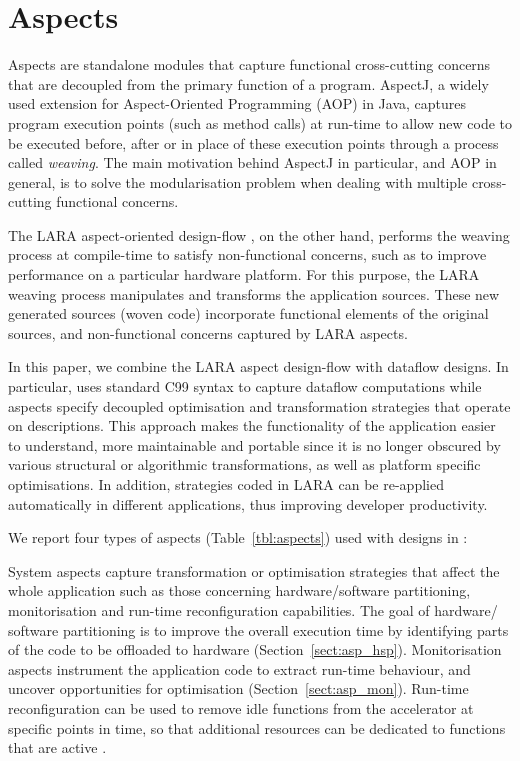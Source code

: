 \section{Aspects}
\label{sec:aspects}

Aspects are standalone modules that capture functional cross-cutting
concerns that are decoupled from the primary function of a
program. AspectJ\cite{Kiczales:2005:AP:1062455.1062640}, a widely
used extension for Aspect-Oriented Programming (AOP) in Java, captures
program execution points (such as method calls) at run-time to allow
new code to be executed before, after or in place of these execution
points through a process called \emph{weaving}. The main motivation
behind AspectJ in particular, and AOP in general, is to solve the
modularisation problem when dealing with multiple cross-cutting
functional concerns.

The LARA aspect-oriented
design-flow \cite{Cardoso:Carvalho:Cutinho:Luk:Nobre:Diniz:Petrov:2012},
on the other hand, performs the weaving process at compile-time to
satisfy non-functional concerns, such as to improve performance on a
particular hardware platform. For this purpose, the LARA weaving
process manipulates and transforms the application sources. These new
generated sources (woven code) incorporate functional elements of the
original sources, and non-functional concerns captured by LARA
aspects.

In this paper, we combine the LARA aspect design-flow with \MAXC{}
dataflow designs. In particular, \MAXC{} uses standard C99 syntax to
capture dataflow computations while aspects specify decoupled
optimisation and transformation strategies that operate on \MAXC{}
descriptions. This approach makes the functionality of the application
easier to understand, more maintainable and portable since it is no
longer obscured by various structural or algorithmic transformations,
as well as platform specific optimisations. In addition, strategies
coded in LARA can be re-applied automatically in different
applications, thus improving developer productivity.

We report four types of aspects (Table~\ref{tbl:aspects}) used with
designs in \MAXC{}:

\vspace*{1.2ex}
 System aspects capture transformation
or optimisation strategies that affect the whole application such as
those concerning hardware/software partitioning, monitorisation and
run-time reconfiguration capabilities. The goal of hardware/ software
partitioning is to improve the overall execution time by identifying
parts of the code to be offloaded to hardware
(Section~\ref{sect:asp_hsp}). Monitorisation aspects instrument the
application code to extract run-time behaviour, and uncover
opportunities for optimisation (Section~\ref{sect:asp_mon}).
Run-time reconfiguration can be used to remove idle functions
from the accelerator at specific points in time, so that
additional resources can be dedicated to functions that are
active \cite{Xinyu:Qiwei:Luk:Qiang:Pell:2012}.

